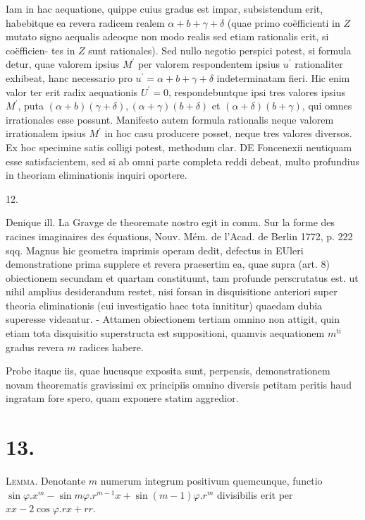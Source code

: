 \documentclass[10pt]{article}
\begin{document}
Iam in hac aequatione, quippe cuius gradus est impar, subsistendum erit, habebitque ea revera radicem realem \(\alpha+b+\gamma+\delta\) (quae primo coëfficienti in \(Z\) mutato signo aequalis adeoque non modo realis sed etiam rationalis erit, si coëfficien-
tes in \(Z\) sunt rationales). Sed nullo negotio perspici potest, si formula detur, quae valorem ipsius \(M^{\prime}\) per valorem respondentem ipsius \(u^{\prime}\) rationaliter exhibeat, hanc necessario pro \(u^{\prime}=\alpha+b+\gamma+\delta\) indeterminatam fieri. Hic enim valor ter erit radix aequationis \(U^{\prime}=0\), respondebuntque ipsi tres valores ipsius \(M^{\prime}\), puta \((\alpha+b)(\gamma+\delta),(\alpha+\gamma)(b+\delta)\) et \((\alpha+\delta)(b+\gamma)\), qui omnes irrationales esse possunt. Manifesto autem formula rationalis neque valorem irrationalem ipsius \(M^{\prime}\) in hoc casu producere posset, neque tres valores diversos. Ex hoc specimine satis colligi potest, methodum clar. DE Foncenexii neutiquam esse satisfacientem, sed si ab omni parte completa reddi debeat, multo profundius in theoriam eliminationis inquiri oportere.

12.

Denique ill. La Gravge de theoremate nostro egit in comm. Sur la forme des racines imaginaires des équations, Nouv. Mém. de l'Acad. de Berlin 1772, p. 222 sqq. Magnus hic geometra imprimis operam dedit, defectus in EUleri demonstratione prima supplere et revera praesertim ea, quae supra (art. 8) obiectionem secundam et quartam constituunt, tam profunde perscrutatus est. ut nihil amplius desiderandum restet, nisi forsan in disquisitione anteriori super theoria eliminationis (cui investigatio haec tota innititur) quaedam dubia superesse videantur. - Attamen obiectionem tertiam omnino non attigit, quin etiam tota disquisitio superstructa est suppositioni, quamvis aequationem \(m^{\text {ti }}\) gradus revera \(m\) radices habere.

Probe itaque iis, quae hucusque exposita sunt, perpensis, demonstrationem novam theorematis gravissimi ex principiis omnino diversis petitam peritis haud ingratam fore spero, quam exponere statim aggredior.

\section*{13.}
\textsc{Lemma.} Denotante \(m\) numerum integrum positivum quemcunque, functio \(\sin \varphi . x^{m}-\sin m \varphi . r^{m-1} x+\sin (m-1) \varphi . r^{m}\) divisibilis erit per \(x x-2 \cos \varphi . r x+r r\).
\end{document}

